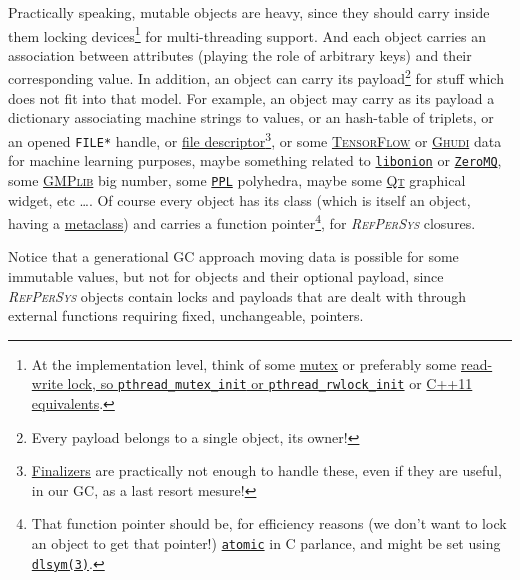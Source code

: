 \documentclass[11pt,a4paper,svgnames]{article}
\newcommand{\RefPerSys}{{\textit{\textsc{RefPerSys}}}}
\begin{document}
Practically speaking, mutable objects are heavy, since they should
carry inside them locking devices\footnote{At the implementation
level, think of some
\href{https://computing.llnl.gov/tutorials/pthreads/\#Mutexes}{mutex}
or preferably some
\href{http://tuxthink.blogspot.com/2013/02/using-read-write-lock-in-pthreads.html}{read-write
  lock, so
  \href{https://pubs.opengroup.org/onlinepubs/7908799/xsh/pthread\_mutex\_init.html}{\texttt{pthread\_mutex\_init}}
  or
  \href{https://pubs.opengroup.org/onlinepubs/7908799/xsh/pthread_rwlock_init.html}{\texttt{pthread\_rwlock\_init}}}
or \href{https://en.cppreference.com/w/cpp/thread}{C++11
  equivalents}.} for multi-threading support. And each object carries
an association between attributes (playing the role of arbitrary keys)
and their corresponding value. In addition, an object can carry its
payload\footnote{Every payload belongs to a single object, its owner!}
for stuff which does not fit into that model. For example, an object
may carry as its payload a dictionary associating machine strings to
values, or an hash-table of triplets, or an opened \texttt{FILE*}
handle, or \href{https://en.wikipedia.org/wiki/File\_descriptor}{file
  descriptor}\footnote{\href{https://en.wikipedia.org/wiki/Finalizer}{Finalizers}
are practically not enough to handle these, even if they are useful,
in our GC, as a last resort mesure!}, or some
\href{https://www.tensorflow.org/}{\textsc{TensorFlow}} or
\href{https://gudhi.inria.fr/}{\textsc{Ghudi}} data for machine
learning purposes, maybe something related to
\href{https://github.com/davidmoreno/onion/}{\texttt{libonion}} or
\href{http://zeromq.org}{\texttt{ZeroMQ}}, some
\href{https://gmplib.org/}{\textsc{GMPlib}} big number, some
\href{https://www.bugseng.com/ppl}{\texttt{PPL}} polyhedra, maybe some
\href{http://qt.io/}{\textsc{Qt}} graphical widget, etc \ldots. Of
course every object has its class (which is itself an object, having a
\href{https://en.wikipedia.org/wiki/Metaclass}{metaclass}) and carries
a function pointer\footnote{That function pointer should be, for
efficiency reasons (we don't want to lock an object to get that
pointer!)
\href{https://en.cppreference.com/w/c/atomic}{\texttt{atomic}} in C
parlance, and might be set using
\href{http://man7.org/linux/man-pages/man3/dlsym.3.html}{\texttt{dlsym(3)}}.}, for {\RefPerSys} closures.

Notice that a generational GC approach moving data is possible for
some immutable values, but not for objects and their optional payload,
since {\RefPerSys} objects contain locks and payloads that are dealt
with through external functions requiring fixed, unchangeable, pointers.
\end{document}

